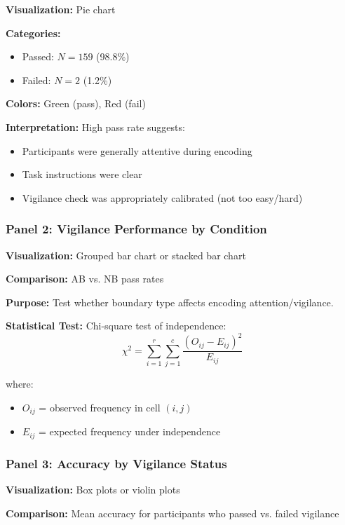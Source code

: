 \documentclass[12pt,a4paper]{article}
\begin{document}
\textbf{Visualization:} Pie chart

\textbf{Categories:}
\begin{itemize}
    \item Passed: $N=159$ (98.8\%)
    \item Failed: $N=2$ (1.2\%)
\end{itemize}

\textbf{Colors:} Green (pass), Red (fail)

\textbf{Interpretation:} High pass rate suggests:
\begin{itemize}
    \item Participants were generally attentive during encoding
    \item Task instructions were clear
    \item Vigilance check was appropriately calibrated (not too easy/hard)
\end{itemize}

\subsubsection{Panel 2: Vigilance Performance by Condition}

\textbf{Visualization:} Grouped bar chart or stacked bar chart

\textbf{Comparison:} AB vs. NB pass rates

\textbf{Purpose:} Test whether boundary type affects encoding attention/vigilance.

\textbf{Statistical Test:} Chi-square test of independence:
\begin{equation}
\chi^2 = \sum_{i=1}^{r} \sum_{j=1}^{c} \frac{(O_{ij} - E_{ij})^2}{E_{ij}}
\end{equation}

where:
\begin{itemize}
    \item $O_{ij}$ = observed frequency in cell $(i,j)$
    \item $E_{ij}$ = expected frequency under independence
\end{itemize}

\subsubsection{Panel 3: Accuracy by Vigilance Status}

\textbf{Visualization:} Box plots or violin plots

\textbf{Comparison:} Mean accuracy for participants who passed vs. failed vigilance
\end{document}
